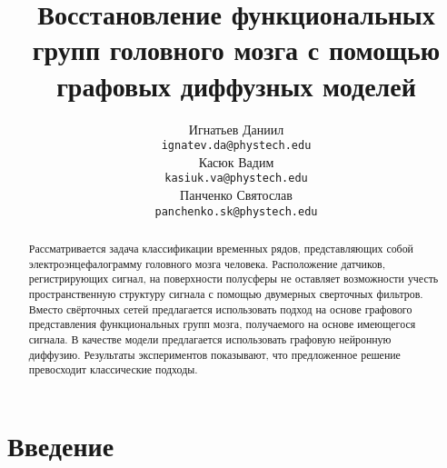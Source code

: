 \documentclass{article}
\title{Восстановление функциональных групп головного мозга с помощью графовых диффузных моделей}
\author{
    Игнатьев Даниил \\
	\texttt{ignatev.da@phystech.edu} \\
	\And
	Касюк Вадим \\
	\texttt{kasiuk.va@phystech.edu} \\
	\And
	Панченко Святослав \\
	\texttt{panchenko.sk@phystech.edu}
}
\date{}
\begin{document}
\maketitle

\begin{abstract}
Рассматривается задача классификации временных рядов, представляющих собой электроэнцефалограмму головного мозга человека. Расположение датчиков, регистрирующих сигнал, на поверхности полусферы не оставляет возможности учесть пространственную структуру сигнала с помощью двумерных сверточных фильтров. Вместо свёрточных сетей предлагается использовать подход на основе графового представления функциональных групп мозга, получаемого на основе имеющегося сигнала. В качестве модели предлагается использовать графовую нейронную диффузию. Результаты экспериментов показывают, что предложенное решение превосходит классические подходы.

\end{abstract}



\section{Введение}
\end{document}
